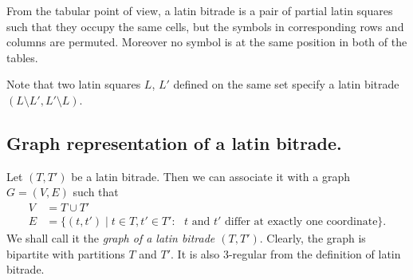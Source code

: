 From the tabular point of view, a latin bitrade is a pair of partial latin squares such that they occupy the same cells, but the symbols in corresponding rows and columns are permuted. Moreover no symbol is at the same position in both of the tables.


Note that two latin squares $L$, $L'$ defined on the same set specify a latin bitrade $(L \setminus L', L' \setminus L)$.

\subsection{Graph representation of a latin bitrade.}

Let $(T, T')$ be a latin bitrade. Then we can associate it with a graph $G = (V, E)$ such that
\begin{align}
	V &= T \cup T' \nonumber\\
	E &= \{(t,t') \mid t \in T, t' \in T': \textrm{  $t$ and $t'$ differ at exactly one coordinate}\}.\nonumber
\end{align}%
We shall call it the \emph{graph of a latin bitrade $(T, T')$}. Clearly, the graph is bipartite with partitions $T$ and $T'$. It is also 3-regular from the definition of latin bitrade.



